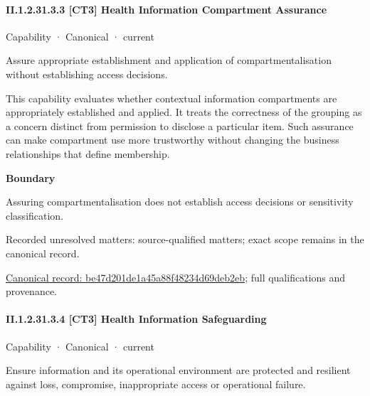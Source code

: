 \paragraph*{II.1.2.31.3.3 [CT3] Health Information Compartment Assurance}
\label{navigation:II.1.2.31.3.3}

\label{element:be47d201de1a45a88f48234d69deb2eb}
{\small Capability · Canonical · current}\par

Assure appropriate establishment and application of compartmentalisation without establishing access decisions.



This capability evaluates whether contextual information compartments are appropriately established and applied. It treats the correctness of the grouping as a concern distinct from permission to disclose a particular item. Such assurance can make compartment use more trustworthy without changing the business relationships that define membership.



\textbf{Boundary}



Assuring compartmentalisation does not establish access decisions or sensitivity classification.


{\small Recorded unresolved matters: source-qualified matters; exact scope remains in the canonical record.}\par
{\footnotesize \href{../../../../continuum/strategy/capability/be47d201de1a45a88f48234d69deb2eb.md}{Canonical record: be47d201de1a45a88f48234d69deb2eb}; full qualifications and provenance.}\par
\paragraph*{II.1.2.31.3.4 [CT3] Health Information Safeguarding}
\label{navigation:II.1.2.31.3.4}

\label{element:6e89db75de5b4c4c9274f78c8d9e665a}
{\small Capability · Canonical · current}\par

Ensure information and its operational environment are protected and resilient against loss, compromise, inappropriate access or operational failure.



